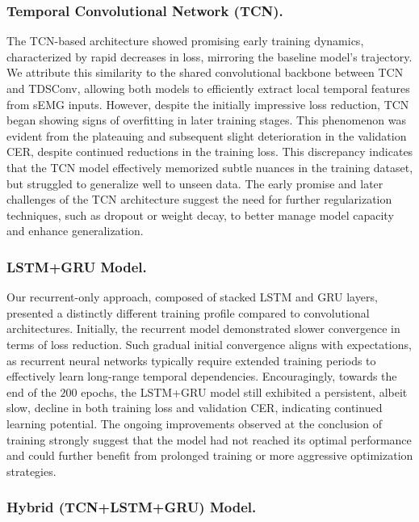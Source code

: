 \subsubsection{Temporal Convolutional Network (TCN).}

The TCN-based architecture showed promising early training dynamics, characterized by rapid decreases in loss, mirroring the baseline model’s trajectory. We attribute this similarity to the shared convolutional backbone between TCN and TDSConv, allowing both models to efficiently extract local temporal features from sEMG inputs. However, despite the initially impressive loss reduction, TCN began showing signs of overfitting in later training stages. This phenomenon was evident from the plateauing and subsequent slight deterioration in the validation CER, despite continued reductions in the training loss. This discrepancy indicates that the TCN model effectively memorized subtle nuances in the training dataset, but struggled to generalize well to unseen data. The early promise and later challenges of the TCN architecture suggest the need for further regularization techniques, such as dropout or weight decay, to better manage model capacity and enhance generalization.

\subsubsection{LSTM+GRU Model.}

Our recurrent-only approach, composed of stacked LSTM and GRU layers, presented a distinctly different training profile compared to convolutional architectures. Initially, the recurrent model demonstrated slower convergence in terms of loss reduction. Such gradual initial convergence aligns with expectations, as recurrent neural networks typically require extended training periods to effectively learn long-range temporal dependencies. Encouragingly, towards the end of the $200$ epochs, the LSTM+GRU model still exhibited a persistent, albeit slow, decline in both training loss and validation CER, indicating continued learning potential. The ongoing improvements observed at the conclusion of training strongly suggest that the model had not reached its optimal performance and could further benefit from prolonged training or more aggressive optimization strategies.

\subsubsection{Hybrid (TCN+LSTM+GRU) Model.}

